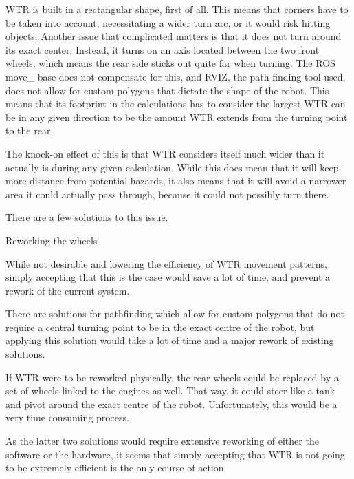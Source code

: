 WTR is built in a rectangular shape, first of all.
This means that corners have to be taken into account, necessitating a wider turn arc, or it would risk hitting objects.
Another issue that complicated matters is that it does not turn around its exact center.
Instead, it turns on an axis located between the two front wheels, which means the rear side sticks out quite far when turning.
The ROS move\_ base does not compensate for this, and RVIZ, the path-finding tool used, does not allow for custom polygons that dictate the shape of the robot.
This means that its footprint in the calculations has to consider the largest WTR can be in any given direction to be the amount WTR extends from the turning point to the rear.

The knock-on effect of this is that WTR considers itself much wider than it actually is during any given calculation.
While this does mean that it will keep more distance from potential hazards, it also means that it will avoid a narrower area it could actually pass through, because it could not possibly turn there.

There are a few solutions to this issue.
\begin{labeling}{Reworking the wheels}
\item [Accepting it] While not desirable and lowering the efficiency of WTR movement patterns, simply accepting that this is the case would save a lot of time, and prevent a rework of the current system.
\item [Changing Software] There are solutions for pathfinding which allow for custom polygons that do not require a central turning point to be in the exact centre of the robot, but applying this solution would take a lot of time and a major rework of existing solutions.
\item [Reworking the wheels] If WTR were to be reworked physically, the rear wheels could be replaced by a set of wheels linked to the engines as well. That way, it could steer like a tank and pivot around the exact centre of the robot. Unfortunately, this would be a very time consuming process.
\end{labeling}

As the latter two solutions would require extensive reworking of either the software or the hardware, it seems that simply accepting that WTR is not going to be extremely efficient is the only course of action.

\newpage